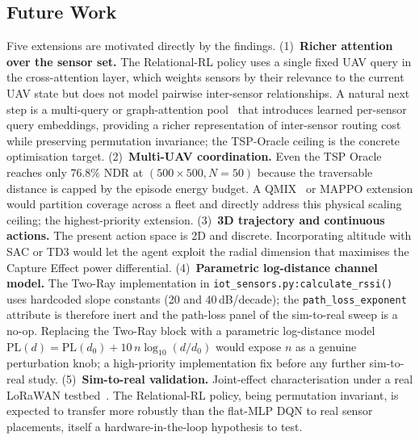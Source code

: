 \subsection{Future Work}
\label{sec:future_work}

Five extensions are motivated directly by the findings.
(1)~\textbf{Richer attention over the sensor set.} The Relational-RL
policy uses a single fixed UAV query in the cross-attention layer,
which weights sensors by their relevance to the current UAV state but
does not model pairwise inter-sensor relationships. A natural next
step is a multi-query or graph-attention
pool~\cite{kool2018attention} that introduces learned per-sensor query
embeddings, providing a richer representation of inter-sensor routing
cost while preserving permutation invariance; the TSP-Oracle ceiling
is the concrete optimisation target.
(2)~\textbf{Multi-UAV coordination.} Even the TSP Oracle reaches
only $76.8\%$ NDR at $(500{\times}500, N{=}50)$ because the
traversable distance is capped by the episode energy budget. A
QMIX~\cite{rashid2018qmix} or MAPPO extension would partition
coverage across a fleet and directly address this physical scaling
ceiling; the highest-priority extension.
(3)~\textbf{3D trajectory and continuous actions.} The present
action space is 2D and discrete. Incorporating altitude with SAC or
TD3 would let the agent exploit the radial dimension that maximises
the Capture Effect power differential.
(4)~\textbf{Parametric log-distance channel model.} The Two-Ray
implementation in \texttt{iot\_sensors.py:\allowbreak calculate\_rssi()}
uses hardcoded slope constants (20 and 40\,dB/decade); the
\texttt{path\_loss\_exponent} attribute is therefore inert and the
path-loss panel of the sim-to-real sweep is a no-op. Replacing the
Two-Ray block with a parametric log-distance model
$\mathrm{PL}(d) = \mathrm{PL}(d_0) + 10\,n\log_{10}(d/d_0)$ would
expose $n$ as a genuine perturbation knob; a high-priority
implementation fix before any further sim-to-real study.
(5)~\textbf{Sim-to-real validation.} Joint-effect characterisation
under a real LoRaWAN
testbed~\cite{tobin2017domain,zhao2021sim2real}. The Relational-RL
policy, being permutation invariant, is expected to transfer more
robustly than the flat-MLP DQN to real sensor placements, itself a
hardware-in-the-loop hypothesis to test.
